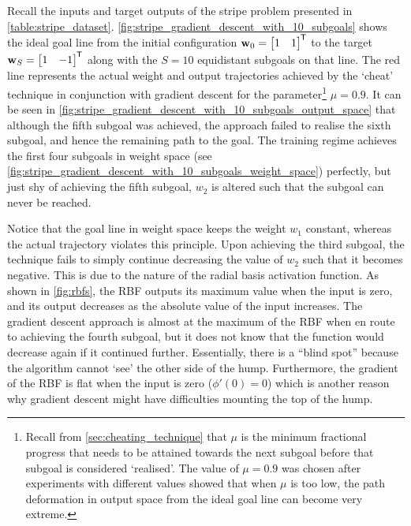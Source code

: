 Recall the inputs and target outputs of the stripe problem presented in \ref{table:stripe_dataset}.
\ref{fig:stripe_gradient_descent_with_10_subgoals} shows the ideal goal line from the initial configuration
$\mathbf{w}_0=
\begin{bmatrix}
    1 & 1
\end{bmatrix}^{\mkern-1.5mu\mathsf{T}}$
to the target
$\mathbf{w}_S=
\begin{bmatrix}
    1 & -1
\end{bmatrix}^{\mkern-1.5mu\mathsf{T}}$
along with the $S=10$ equidistant subgoals on that line.
The red line represents the actual weight and output trajectories achieved by the `cheat' technique in conjunction with gradient descent for the parameter\footnote{Recall from \ref{sec:cheating_technique} that $\mu$ is the minimum fractional progress that needs to be attained towards the next subgoal before that subgoal is considered `realised'. The value of $\mu=0.9$ was chosen after experiments with different values showed that when $\mu$ is too low, the path deformation in output space from the ideal goal line can become very extreme.} $\mu=0.9$.
It can be seen in \ref{fig:stripe_gradient_descent_with_10_subgoals_output_space} that although the fifth subgoal was achieved, the approach failed to realise the sixth subgoal, and hence the remaining path to the goal.
The training regime achieves the first four subgoals in weight space (see \ref{fig:stripe_gradient_descent_with_10_subgoals_weight_space}) perfectly, but just shy of achieving the fifth subgoal, $w_2$ is altered such that the subgoal can never be reached. 

Notice that the goal line in weight space keeps the weight $w_1$ constant, whereas the actual trajectory violates this principle. 
Upon achieving the third subgoal, the technique fails to simply continue decreasing the value of $w_2$ such that it becomes negative. 
This is due to the nature of the radial basis activation function. 
As shown in \ref{fig:rbfs}, the RBF outputs its maximum value when the input is zero, and its output decreases as the absolute value of the input increases. 
The gradient descent approach is almost at the maximum of the RBF when en route to achieving the fourth subgoal, but it does not know that the function would decrease again if it continued further.
Essentially, there is a ``blind spot'' \cite{karayiannis1998} because the algorithm cannot `see' the other side of the hump.
Furthermore, the gradient of the RBF is flat when the input is zero ($\phi'(0)=0$) which is another reason why gradient descent might have difficulties mounting the top of the hump.

